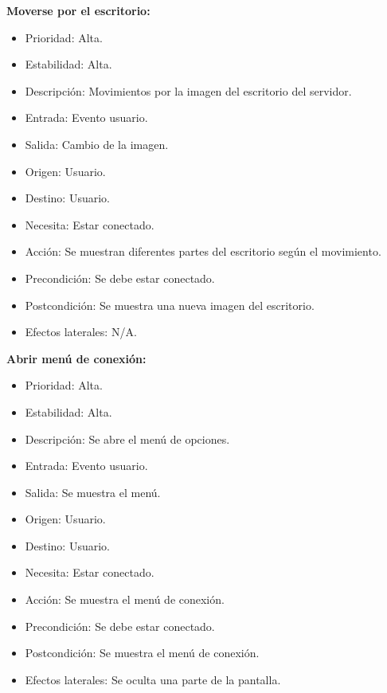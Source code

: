 \textbf{Moverse por el escritorio:}
\begin{itemize}
\item Prioridad: Alta.
\item Estabilidad: Alta.
\item Descripción: Movimientos por la imagen del escritorio del servidor.
\item Entrada: Evento usuario.
\item Salida: Cambio de la imagen.
\item Origen: Usuario.
\item Destino: Usuario.
\item Necesita: Estar conectado.
\item Acción: Se muestran diferentes partes del escritorio según el movimiento.
\item Precondición: Se debe estar conectado.
\item Postcondición: Se muestra una nueva imagen del escritorio.
\item Efectos laterales: N/A.\\

\end{itemize}
\newpage
\textbf{Abrir menú de conexión:}
\begin{itemize}
\item Prioridad: Alta.
\item Estabilidad: Alta.
\item Descripción: Se abre el menú de opciones.
\item Entrada: Evento usuario.
\item Salida: Se muestra el menú.
\item Origen: Usuario.
\item Destino: Usuario.
\item Necesita: Estar conectado.
\item Acción: Se muestra el menú de conexión.
\item Precondición: Se debe estar conectado.
\item Postcondición: Se muestra el menú de conexión.
\item Efectos laterales: Se oculta una parte de la pantalla.\\

\end{itemize}


